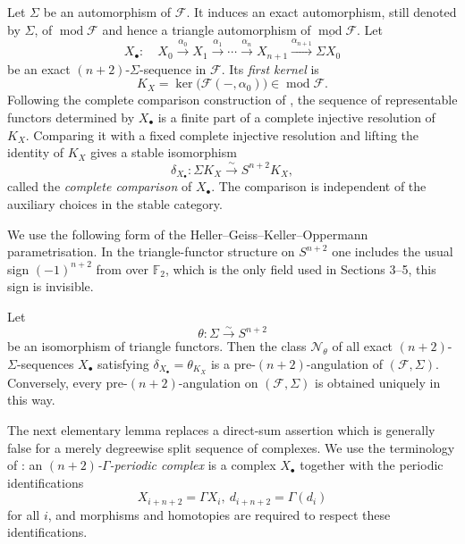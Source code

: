 \documentclass[12pt, twoside]{article}
\numberwithin{equation}{section}
\begin{document}
Let $\Sigma$ be an automorphism of $\mathcal F$. It induces an exact automorphism, still denoted by $\Sigma$, of $\operatorname{mod}\mathcal F$ and hence a triangle automorphism of $\underline{\operatorname{mod}}\mathcal F$. Let
\[
X_\bullet:\quad X_0\xrightarrow{\alpha_0}X_1\xrightarrow{\alpha_1}\cdots\xrightarrow{\alpha_n}X_{n+1}\xrightarrow{\alpha_{n+1}}\Sigma X_0
\]
be an exact $(n+2)$-$\Sigma$-sequence in $\mathcal F$. Its \emph{first kernel} is
\[
K_X=\ker\bigl(\mathcal F(-,\alpha_0)\bigr)\in\operatorname{mod}\mathcal F.
\]
Following the complete comparison construction of \cite[Section 2]{GKO}, the sequence of representable functors determined by $X_\bullet$ is a finite part of a complete injective resolution of $K_X$. Comparing it with a fixed complete injective resolution and lifting the identity of $K_X$ gives a stable isomorphism
\begin{equation*}
\delta_{X_\bullet}:\Sigma K_X\xrightarrow{\sim}S^{n+2}K_X,
\end{equation*}
called the \emph{complete comparison} of $X_\bullet$. The comparison is independent of the auxiliary choices in the stable category.

We use the following form of the Heller--Geiss--Keller--Oppermann parametrisation. In the triangle-functor structure on $S^{n+2}$ one includes the usual sign $(-1)^{n+2}$ from \cite{GKO} over $\mathbb F_2$, which is the only field used in Sections 3--5, this sign is invisible.

\begin{theorem}\rm\cite[Lemma 2.3 and Proposition 2.4]{GKO}\label{mai}
Let
\[
\theta:\Sigma\xrightarrow{\sim}S^{n+2}
\]
be an isomorphism of triangle functors. Then the class $\mathcal N_\theta$ of all exact $(n+2)$-$\Sigma$-sequences $X_\bullet$ satisfying
$
\delta_{X_\bullet}=\theta_{K_X}
$
is a pre-$(n+2)$-angulation of $(\mathcal F,\Sigma)$. Conversely, every pre-$(n+2)$-angulation on $(\mathcal F,\Sigma)$ is obtained uniquely in this way.
\end{theorem}

The next elementary lemma replaces a direct-sum assertion which is generally false for a merely degreewise split sequence of complexes. We use the terminology of \cite[Section 1.3]{GKO}: an \emph{$(n+2)$-$\Gamma$-periodic complex} is a complex $X_\bullet$ together with the periodic identifications
\[
X_{i+n+2}=\Gamma X_i,~d_{i+n+2}=\Gamma(d_i)
\]
for all $i$, and morphisms and homotopies are required to respect these identifications.
\end{document}
